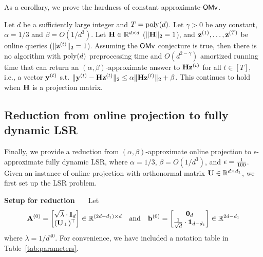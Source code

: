 As a corollary, we prove the hardness of constant approximate-$\mathsf{OMv}$.
\begin{theorem}
\label{thm:hard-omv-approx}
Let $d$ be a sufficiently large integer and $T = \operatorname{poly}(d)$.
Let $\gamma > 0$ be any constant, $\alpha = 1/3$ and $\beta = O(1/d^3)$. 
Let $\mathbf{H}\in \mathbb{R}^{d\times d}$ ($\|\mathbf{H}\|_2 =1$), and $\mathbf{z}^{(1)}, \ldots, \mathbf{z}^{(T)}$ be online queries ($\|\mathbf{z}^{(t)}\|_2 = 1$).
Assuming the $\mathsf{OMv}$ conjecture is true, then there is no algorithm with $\operatorname{poly}(d)$ preprocessing time and $O(d^{2-\gamma})$ amortized running time that can return an $(\alpha, \beta)$-approximate answer to $\mathbf{H}\mathbf{z}^{(t)}$ for all $t \in [T]$, i.e., a vector $\mathbf{y}^{(t)}$ s.t. $\|\mathbf{y}^{(t)} - \mathbf{H}\mathbf{z}^{(t)}\|_2 \leq \alpha \|\mathbf{H}\mathbf{z}^{(t)}\|_2 + \beta$. This continues to hold when $\mathbf{H}$ is a projection matrix.
\end{theorem}




















\subsection{Reduction from online projection to fully dynamic LSR}
\label{sec:reduction}
Finally, we provide a reduction from $(\alpha, \beta)$-approximate online projection to $\epsilon$-approximate fully dynamic LSR, where $\alpha = 1/3$, $\beta = O(1/d^3)$, and $\epsilon = \frac{1}{100}$. 
Given an instance of online projection with orthonormal matrix $\mathbf{U} \in \mathbb{R}^{d \times d_1}$, we first set up the LSR problem.

\vspace{+2mm}
{\bf \noindent Setup for reduction \ \ } Let 
\begin{align*}
\mathbf{A}^{(0)} = 
\left[
\begin{matrix}
\sqrt{\lambda} \cdot \mathbf{I}_d \\
(\mathbf{U}_\perp)^{\top}
\end{matrix}
\right] \in \mathbb{R}^{(2d-d_1) \times d}  \quad \text{and} \quad \mathbf{b}^{(0)} = 
\left[
\begin{matrix}
\mathbf{0}_d\\
\frac{1}{\sqrt{d}} \cdot \mathbf{1}_{d-d_1}
\end{matrix} 
\right] 
\in \mathbb{R}^{2d-d_1}
\end{align*}
where $\lambda = 1/d^{40}$. For convenience, we have included a notation table in Table~\ref{tab:parameters}.



